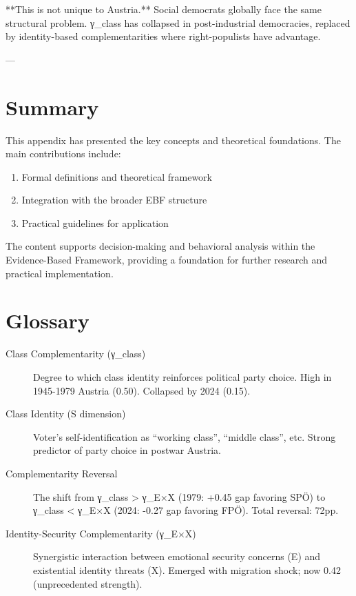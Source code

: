 {{{{{{{{**This is not unique to Austria.** Social democrats globally face the same structural problem. γ_class has collapsed in post-industrial democracies, replaced by identity-based complementarities where right-populists have advantage.

---

\section{Summary}
\label{sec:bt-summary}

This appendix has presented the key concepts and theoretical foundations.
The main contributions include:

\begin{enumerate}
    \item Formal definitions and theoretical framework
    \item Integration with the broader EBF structure
    \item Practical guidelines for application
\end{enumerate}

The content supports decision-making and behavioral analysis within the
Evidence-Based Framework, providing a foundation for further research
and practical implementation.


\section{Glossary}
\label{sec:glossary}

\begin{description}

\item[Class Complementarity (γ_class)] Degree to which class identity reinforces political party choice. High in 1945-1979 Austria (0.50). Collapsed by 2024 (0.15).

\item[Class Identity (S dimension)] Voter's self-identification as ``working class'', ``middle class'', etc. Strong predictor of party choice in postwar Austria.

\item[Complementarity Reversal] The shift from γ_class > γ_{E×X} (1979: +0.45 gap favoring SPÖ) to γ_class < γ_{E×X} (2024: -0.27 gap favoring FPÖ). Total reversal: 72pp.

\item[Identity-Security Complementarity (γ_{E×X})] Synergistic interaction between emotional security concerns (E) and existential identity threats (X). Emerged with migration shock; now 0.42 (unprecedented strength).


\end{description}}}}}}}}}

